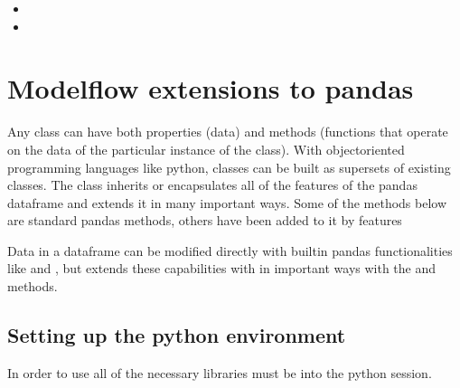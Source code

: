 \documentclass[letterpaper,10pt,english]{jupyterBook}
\begin{document}
\sphinxAtStartPar
{}
\begin{itemize}
\item {} 
\sphinxAtStartPar
{}

\item {} 
\sphinxAtStartPar
{}

\end{itemize}

\sphinxstepscope


\chapter{Modelflow extensions to pandas}
\label{\detokenize{content/04_PythonEssentials/UpdateCommand:modelflow-extensions-to-pandas}}\label{\detokenize{content/04_PythonEssentials/UpdateCommand::doc}}
\sphinxAtStartPar
Any class can have both properties (data) and methods (functions that operate on the data of the particular instance of the class). With object\sphinxhyphen{}oriented programming languages like python, classes can be built as supersets of existing classes. The  class  inherits or encapsulates all of the features of the pandas dataframe and extends it in many important ways.  Some of the methods below are standard pandas methods, others have been added to it by  features

\sphinxAtStartPar
Data in a dataframe can be modified directly with built\sphinxhyphen{}in pandas functionalities like  and , but  extends these capabilities with in important ways with the  and  methods.


\section{Setting up the python environment}
\label{\detokenize{content/04_PythonEssentials/UpdateCommand:setting-up-the-python-environment}}
\sphinxAtStartPar
In order to use  all of the necessary libraries must be  into the python session.
\end{document}
